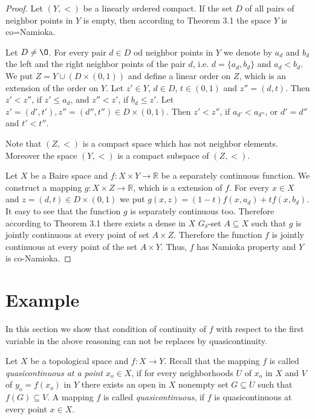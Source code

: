 \documentclass{amsart}
\begin{document}
\begin{proof} Let  $(Y,<)$ be a linearly ordered compact. If the set $D$ of all pairs of neighbor points in $Y$ is empty, then according to Theorem 3.1 the space $Y$ is co=Namioka.

Let $D\ne \O$. For every pair $d\in D$ od neighbor points in $Y$ we denote by $a_d$ and $b_d$ the left and the right neighbor points of the pair $d$, i.e. $d=\{a_d,b_d\}$ and $a_d<b_d$. We put $Z=Y\cup(D\times (0,1))$ and define a linear order on $Z$, which is an extension of the order on $Y$. Let  $z'\in Y$, $d\in D$, $t\in (0,1)$ and $z''=(d,t)$. Then $z'<z''$, if $z'\leq a_d$, and $z''<z'$, if $b_d\leq z'$. Let $z'=(d',t'),z''=(d'',t'')\in D\times (0,1)$. Then $z'<z''$, if $a_{d'}<a_{d''}$, or $d'=d''$ and $t'<t''$.

Note that $(Z,<)$ is a compact space which has not neighbor elements. Moreover the space $(Y,<)$ is a compact subspace of $(Z,<)$.

Let $X$ be a Baire space and $f:X\times Y\to \mathbb R$ be a separately continuous function. We construct a mapping $g:X\times Z\to \mathbb R$, which is a extension of $f$. For every $x\in X$ and $z=(d,t)\in D\times (0,1) $ we put $g(x,z)=(1-t)f(x,a_d)+tf(x,b_d)$. It easy to see that the function $g$ is separately continuous too. Therefore according to Theorem 3.1 there exists a dense in $X$ $G_{\delta}$-set $A\subseteq X$ such that $g$ is jointly continuous at every point of set $A\times Z$. Therefore the function $f$ is jointly continuous at every point of the set $A\times Y$. Thus, $f$ has Namioka property and $Y$ is co-Namioka.
\end{proof}

\section{Example}

In this section we show that condition of continuity of $f$ with respect to the first variable in the above reasoning can not be replaces by quasicontinuity.

Let $X$ be a topological space and $f:X\to Y$. Recall that the mapping $f$ is called {\it quasicontinuous at a point $x_o\in X$}, if for every neighborhoods $U$ of $x_o$ in $X$ and $V$ of $y_o=f(x_o)$ in $Y$ there exists an open in $X$ nonempty set $G\subseteq U$ such that $f(G)\subseteq V$. A mapping $f$ is called {\it quasicontinuous}, if $f$ is quasicontinuous at every point $x\in X$.
\end{document}
